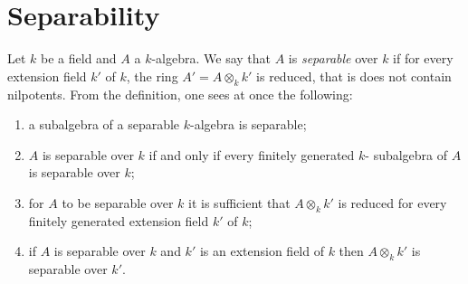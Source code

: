 \section{Separability}\label{sec:26}

Let $k$ be a field and $A$ a $k$-algebra. We say that $A$ is \emph{separable} over $k$ if for
every extension field $k'$ of $k$, the ring $A' = A \otimes_k k'$ is reduced, that is does
not contain nilpotents. From the definition, one sees at once the following:
\begin{enumerate}[(1)]
  \item a subalgebra of a separable $k$-algebra is separable;
  \item $A$ is separable over $k$ if and only if every finitely generated $k$-
        subalgebra of $A$ is separable over $k$;
  \item for $A$ to be separable over $k$ it is sufficient that $A \otimes_k k'$ is reduced
        for every finitely generated extension field $k'$ of $k$;
  \item if $A$ is separable over $k$ and $k'$ is an extension field of $k$ then
        $A \otimes_k k'$ is separable over $k'$.
\end{enumerate}


